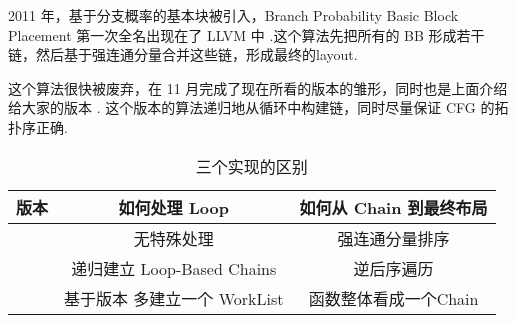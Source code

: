 2011 年，基于分支概率的基本块被引入，Branch Probability Basic Block Placement 第一次全名出现在了 LLVM 中 \cite{llvmmachineblockplacementintro2011}.这个算法先把所有的 BB 形成若干链，然后基于强连通分量合并这些链，形成最终的layout.

这个算法很快被废弃，在 11 月完成了现在所看的版本的雏形，同时也是上面介绍给大家的版本 \cite{llvmmachineblockplacementimporve2011-1, llvmmachineblockplacementimporve2011-2}. 这个版本的算法递归地从循环中构建链，同时尽量保证 CFG 的拓扑序正确.

\begin{table}
    \begin{tabular}{ccc}
        \toprule
        版本                                            & 如何处理 Loop                                                         & 如何从 Chain 到最终布局 \\
        \midrule
        \cite{llvmmachineblockplacementintro2011}     & 无特殊处理                                                             & 强连通分量排序         \\
        \cite{llvmmachineblockplacementimporve2011-1} & 递归建立 Loop-Based Chains                                            & 逆后序遍历           \\
        \cite{llvmmachineblockplacementimporve2011-2} & 基于版本 \cite{llvmmachineblockplacementimporve2011-1} 多建立一个 WorkList & 函数整体看成一个Chain   \\
        \bottomrule
    \end{tabular}
    \caption{三个实现的区别}
\end{table}